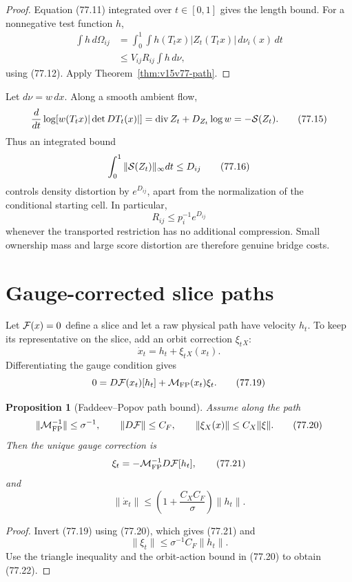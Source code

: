 \documentclass[11pt]{article}
\newtheorem{proposition}[theorem]{Proposition}
\theoremstyle{remark}
\begin{document}
\begin{proof}
Equation (77.11) integrated over \(t\in[0,1]\) gives the length
bound.  For a nonnegative test function \(h\),
\[
\begin{split}
 \int h\,d\Omega_{ij}
 &=
 \int_0^1\int
 h(T_tx)|Z_t(T_tx)|\,d\nu_i(x)\,dt\\
 &\leq
 V_{ij}R_{ij}\int h\,d\nu,
\end{split}
\]
using (77.12).  Apply Theorem~\ref{thm:v15v77-path}.
\end{proof}

Let \(d\nu=w\,dx\).  Along a smooth ambient flow,
\[
 \frac{d}{dt}
 \log\!\left[
 w(T_tx)|\det DT_t(x)|
 \right]
 =
 \operatorname{div}Z_t+
 D_{Z_t}\log w
 =
 -{\cal S}(Z_t).                                      \tag{77.15}
\]
Thus an integrated bound
\[
 \int_0^1\|{\cal S}(Z_t)\|_\infty dt\leq D_{ij}        \tag{77.16}
\]
controls density distortion by \(e^{D_{ij}}\), apart from the
normalization of the conditional starting cell.  In particular,
\[
 R_{ij}\leq p_i^{-1}e^{D_{ij}}                        \tag{77.17}
\]
whenever the transported restriction has no additional
compression.  Small ownership mass and large score distortion are
therefore genuine bridge costs.

\section{Gauge-corrected slice paths}

Let \({\cal F}(x)=0\) define a slice and let a raw physical path
have velocity \(h_t\).  To keep its representative on the slice,
add an orbit correction \(\xi_t{}_X\):
\[
 \dot x_t=h_t+\xi_t{}_X(x_t).                         \tag{77.18}
\]
Differentiating the gauge condition gives
\[
 0=D{\cal F}(x_t)[h_t]
 +{\cal M}_{\rm FP}(x_t)\xi_t.                        \tag{77.19}
\]

\begin{proposition}[Faddeev--Popov path bound]
\label{prop:v15v77-fp-path}
Assume along the path
\[
 \|{\cal M}_{\rm FP}^{-1}\|\leq\sigma^{-1},\qquad
 \|D{\cal F}\|\leq C_F,\qquad
 \|\xi_X(x)\|\leq C_X\|\xi\|.                         \tag{77.20}
\]
Then the unique gauge correction is
\[
 \xi_t=-{\cal M}_{\rm FP}^{-1}D{\cal F}[h_t],          \tag{77.21}
\]
and
\[
 \|\dot x_t\|
 \leq
 \left(1+\frac{C_XC_F}{\sigma}\right)\|h_t\|.          \tag{77.22}
\]
\end{proposition}

\begin{proof}
Invert (77.19) using (77.20), which gives (77.21) and
\[
 \|\xi_t\|\leq\sigma^{-1}C_F\|h_t\|.
\]
Use the triangle inequality and the orbit-action bound in (77.20)
to obtain (77.22).
\end{proof}
\end{document}
